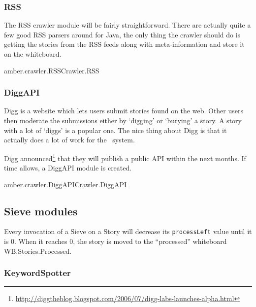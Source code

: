 \subsubsection{RSS}

The RSS crawler module will be fairly straightforward. There are actually quite
a few good RSS parsers around for Java, the only thing the crawler should do is
getting the stories from the RSS feeds along with meta-information and store it
on the whiteboard.

\begin{module}{amber.crawler.RSS}{Crawler.RSS}
\end{module}

\subsubsection{DiggAPI}

Digg is a website which lets users submit stories found on the web. Other users
then moderate the submissions either by `digging' or `burying' a story. A story
with a lot of `diggs' is a popular one. The nice thing about Digg is that it
actually does a lot of work for the \Amber\ system.

Digg
announced\footnote{\url{http://diggtheblog.blogspot.com/2006/07/digg-labs-launches-alpha.html}}
that they will publish a public API within the next months. If time allows, a
DiggAPI module is created.

\begin{module}{amber.crawler.DiggAPI}{Crawler.DiggAPI}
\end{module}

% 

\subsection{Sieve modules}

Every invocation of a Sieve on a Story will decrease its \texttt{processLeft}
value until it is 0. When it reaches 0, the story is moved to the ``processed''
whiteboard WB.Stories.Processed.

\subsubsection{KeywordSpotter}

